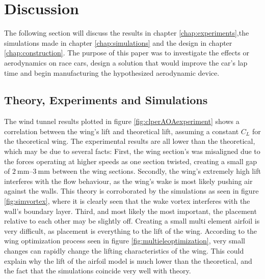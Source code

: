 \chapter{Discussion}
  The following section will discuss the results in chapter \ref{chap:experiments},the simulations made in chapter \ref{chap:simulations} and the design in chapter \ref{chap:construction}. The purpose of this paper was to investigate the effects or aerodynamics on race cars, design a solution that would improve the car's lap time and begin manufacturing the hypothesized aerodynamic device.

  \section{Theory, Experiments and Simulations}

  The wind tunnel results plotted in figure \ref{fig:clperAOAexperiment} shows a correlation between the wing's lift and theoretical lift, assuming a constant $C_L$ for the theoretical wing. The experimental results are all lower than the theoretical, which may be due to several facts: First, the wing section's was misaligned due to the forces operating at higher speeds as one section twisted,  creating a small gap of $\SIrange{2}{3}{\milli\metre}$ between the wing sections. Secondly, the wing's extremely high lift interferes with the flow behaviour, as the wing's wake is most likely pushing air against the walls. This theory is corroborated by the simulations as seen in figure \ref{fig:simvortex}, where it is clearly seen that the wake vortex interferes with the wall's boundary layer. Third, and most likely the most important, the placement relative to each other may be slightly off. Creating a small multi element airfoil is very difficult, as placement is everything to the lift of the wing. According to the wing optimization process seen in figure \ref{fig:multieleoptimization}, very small changes can rapidly change the  lifting characteristics of the wing. This could explain why the lift of the airfoil model is much lower than the theoretical, and the fact that the simulations coincide very well with theory.

